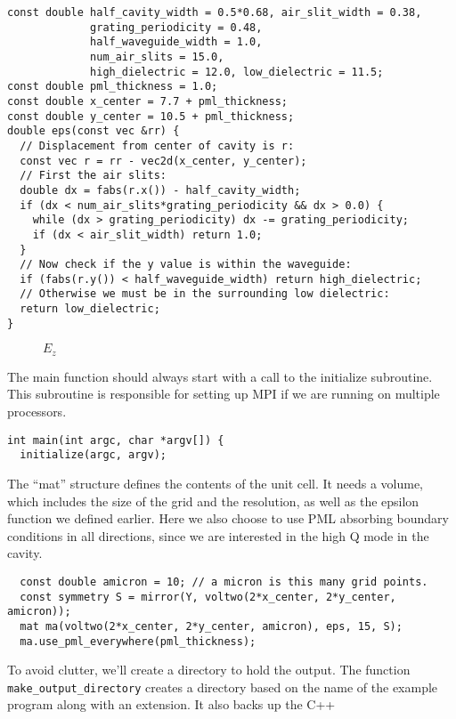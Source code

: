 \begin{verbatim}
const double half_cavity_width = 0.5*0.68, air_slit_width = 0.38,
             grating_periodicity = 0.48,
             half_waveguide_width = 1.0,
             num_air_slits = 15.0,
             high_dielectric = 12.0, low_dielectric = 11.5;
const double pml_thickness = 1.0;
const double x_center = 7.7 + pml_thickness;
const double y_center = 10.5 + pml_thickness;
double eps(const vec &rr) {
  // Displacement from center of cavity is r:
  const vec r = rr - vec2d(x_center, y_center);
  // First the air slits:
  double dx = fabs(r.x()) - half_cavity_width;
  if (dx < num_air_slits*grating_periodicity && dx > 0.0) {
    while (dx > grating_periodicity) dx -= grating_periodicity;
    if (dx < air_slit_width) return 1.0;
  }
  // Now check if the y value is within the waveguide:
  if (fabs(r.y()) < half_waveguide_width) return high_dielectric;
  // Otherwise we must be in the surrounding low dielectric:
  return low_dielectric;
}
\end{verbatim}
\begin{figure}
\label{simple_figure}
\caption{$E_z$}
\begin{center}
\end{center}
\end{figure}
The main function should always start with a call to the initialize
subroutine.  This subroutine is responsible for setting up MPI if we are
running on multiple processors.
\begin{verbatim}
int main(int argc, char *argv[]) {
  initialize(argc, argv);
\end{verbatim}
The ``mat'' structure defines the contents of the unit cell.  It needs a
volume, which includes the size of the grid and the resolution, as well as
the epsilon function we defined earlier.  Here we also choose to use PML
absorbing boundary conditions in all directions, since we are interested in
the high Q mode in the cavity.
\begin{verbatim}
  const double amicron = 10; // a micron is this many grid points.
  const symmetry S = mirror(Y, voltwo(2*x_center, 2*y_center, amicron));
  mat ma(voltwo(2*x_center, 2*y_center, amicron), eps, 15, S);
  ma.use_pml_everywhere(pml_thickness);
\end{verbatim}
To avoid clutter, we'll create a directory to hold the output.  The
function \verb!make_output_directory! creates a directory based on the name
of the example program along with an extension.  It also backs up the C++
